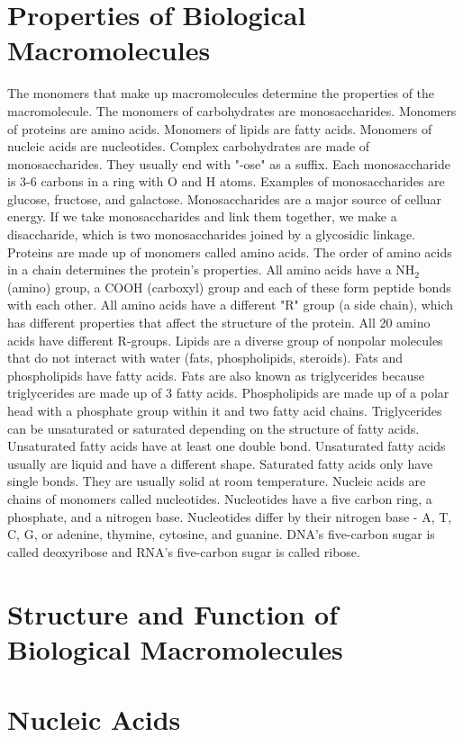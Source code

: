 \documentclass[../bio.tex]{subfiles}
\begin{document}
\section{Properties of Biological Macromolecules}
The monomers that make up macromolecules determine the properties of the macromolecule. The monomers of carbohydrates are monosaccharides. Monomers of proteins are amino acids. Monomers of lipids are fatty acids. Monomers of nucleic acids are nucleotides.
\smallbreak
Complex carbohydrates are made of monosaccharides. They usually end with "-ose" as a suffix. Each monosaccharide is 3-6 carbons in a ring with O and H atoms. Examples of monosaccharides are glucose, fructose, and galactose. Monosaccharides are a major source of celluar energy. 
\smallbreak
If we take monosaccharides and link them together, we make a disaccharide, which is two monosaccharides joined by a glycosidic linkage.
\smallbreak
Proteins are made up of monomers called amino acids. The order of amino acids in a chain determines the protein's properties. All amino acids have a NH$_2$ (amino) group, a COOH (carboxyl) group and each of these form peptide bonds with each other. All amino acids have a different "R" group (a side chain), which has different properties that affect the structure of the protein. All 20 amino acids have different R-groups. 
\smallbreak
Lipids are a diverse group of nonpolar molecules that do not interact with water (fats, phospholipids, steroids). Fats and phospholipids have fatty acids. Fats are also known as triglycerides because triglycerides are made up of 3 fatty acids. Phospholipids are made up of a polar head with a phosphate group within it and two fatty acid chains. 
\smallbreak
Triglycerides can be unsaturated or saturated depending on the structure of fatty acids. Unsaturated fatty acids have at least one double bond. Unsaturated fatty acids usually are liquid and have a different shape. Saturated fatty acids only have single bonds. They are usually solid at room temperature.
\smallbreak
Nucleic acids are chains of monomers called nucleotides. Nucleotides have a five carbon ring, a phosphate, and a nitrogen base. 
\smallbreak
Nucleotides differ by their nitrogen base - A, T, C, G, or adenine, thymine, cytosine, and guanine. DNA's five-carbon sugar is called deoxyribose and RNA's five-carbon sugar is called ribose.
\section{Structure and Function of Biological Macromolecules}
\section{Nucleic Acids}
\end{document}
